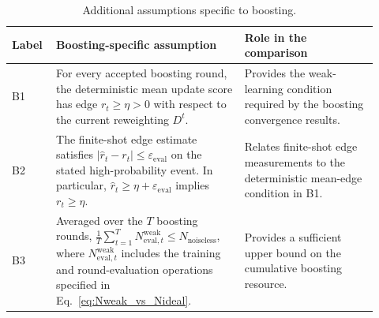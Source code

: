 \begin{table}[!htbp]
\centering
\small
\renewcommand{\arraystretch}{1.2}
\begin{tabular}{p{0.10\linewidth} p{0.48\linewidth} p{0.34\linewidth}}
\hline
\textbf{Label} &
\textbf{Boosting-specific assumption} &
\textbf{Role in the comparison}
\\
\hline

B1 &
For every accepted boosting round, the deterministic mean update score has
edge
$r_t\geq\eta>0$
with respect to the current reweighting $D^t$. &
Provides the weak-learning condition required by the boosting convergence
results.
\\

B2 &
The finite-shot edge estimate satisfies
$|\widehat r_t-r_t|\leq\varepsilon_{\mathrm{eval}}$
on the stated high-probability event. In particular,
$\widehat r_t\geq\eta+\varepsilon_{\mathrm{eval}}$
implies $r_t\geq\eta$. &
Relates finite-shot edge measurements to the deterministic mean-edge
condition in B1.
\\
B3 &
Averaged over the $T$ boosting rounds,
$\frac{1}{T}\sum_{t=1}^{T}N_{\mathrm{eval},t}^{\mathrm{weak}}
\leq N_{\mathrm{noiseless}}$, where
$N_{\mathrm{eval},t}^{\mathrm{weak}}$ includes the training and
round-evaluation operations specified in
Eq.~\eqref{eq:Nweak_vs_Nideal}. &
Provides a sufficient upper bound on the cumulative boosting resource.
\\

\hline
\end{tabular}
\caption{Additional assumptions specific to boosting.}
\label{tab:boosting_assumptions}
\end{table}
